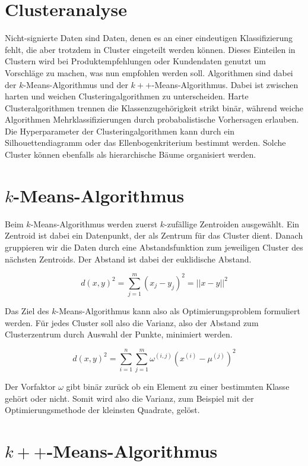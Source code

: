 \documentclass[11pt]{article} %
\begin{document}
\section{Clusteranalyse}

Nicht-signierte Daten sind Daten, denen es an einer eindeutigen Klassifizierung fehlt, die aber trotzdem in Cluster eingeteilt werden können. Dieses Einteilen in Clustern wird bei Produktempfehlungen oder Kundendaten genutzt um Vorschläge zu machen, was nun empfohlen werden soll.
Algorithmen sind dabei der $k$-Means-Algorithmus und der $k++$-Means-Algorithmus. Dabei ist zwischen harten und weichen Clusteringalgorithmen zu unterscheiden. Harte Clusteralgorithmen trennen die Klassenzugehörigkeit strikt binär, während weiche Algorithmen Mehrklassifizierungen durch probabalistische Vorhersagen erlauben. Die Hyperparameter der Clusteringalgorithmen kann durch ein Silhouettendiagramm oder das Ellenbogenkriterium bestimmt werden. Solche Cluster können ebenfalls als hierarchische Bäume organisiert werden.

\section{$k$-Means-Algorithmus}

Beim $k$-Means-Algorithmus werden zuerst $k$-zufällige Zentroiden ausgewählt. Ein Zentroid ist dabei ein Datenpunkt, der als Zentrum für das Cluster dient. Danach gruppieren wir die Daten durch eine Abstandsfunktion zum jeweiligen Cluster des nächsten Zentroids. Der Abstand ist dabei der euklidische Abstand.

\begin{equation}
d(x,y)^2 = \sum_{j=1}^m (x_j-y_j)^2 = ||x-y||^2
\end{equation}

Das Ziel des $k$-Means-Algorithmus kann also als Optimierungsproblem formuliert werden. Für jedes Cluster soll also die Varianz, also der Abstand zum Clusterzentrum durch Auswahl der Punkte, minimiert werden.

\begin{equation}
d(x,y)^2 = \sum_{i=1}^n \sum_{j=1}^m \omega^{(i,j)} (x^{(i)}-\mu^{(j)})^2 
\end{equation}

Der Vorfaktor $\omega$ gibt binär zurück ob ein Element zu einer bestimmten Klasse gehört oder nicht. Somit wird also die Varianz, zum Beispiel mit der Optimierungsmethode der kleinsten Quadrate, gelöst. 

\section{$k++$-Means-Algorithmus}
\end{document}
